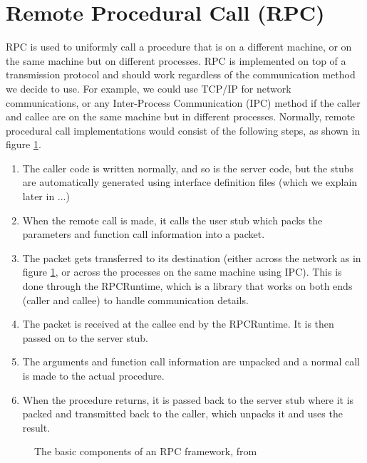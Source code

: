 \section{Remote Procedural Call (RPC)}
\label{RPCBackgroundSection} 
RPC is used to uniformly call a procedure that is on a different machine, or on the same machine but on different processes. RPC is implemented on top of a transmission protocol and should work regardless of the communication method we decide to use. For example, we could use TCP/IP for network communications, or any Inter-Process Communication (IPC) method if the caller and callee are on the same machine but in different processes. Normally, remote procedural call implementations would consist of the following steps, as shown in figure \ref{fig:rpc-components}.

\begin{enumerate}
  \item The caller code is written normally, and so is the server code, but the stubs are automatically generated using interface definition files (which we explain later in ...)
  \item When the remote call is made, it calls the user stub which packs the parameters and function call information into a packet.
  \item The packet gets transferred to its destination (either across the network as in figure \ref{fig:rpc-components}, or across the processes on the same machine using IPC). This is done through the RPCRuntime, which is a library that works on both ends (caller and callee) to handle communication details.
  \item The packet is received at the callee end by the RPCRuntime. It is then passed on to the server stub.
  \item The arguments and function call information are unpacked and a normal call is made to the actual procedure.
  \item When the procedure returns, it is passed back to the server stub where it is packed and transmitted back to the caller, which unpacks it and uses the result.
\end{enumerate}

\begin{figure}
    \centering
    \caption{The basic components of an RPC framework, from \cite{birrell1984implementing}}
    \label{fig:rpc-components}
\end{figure}

